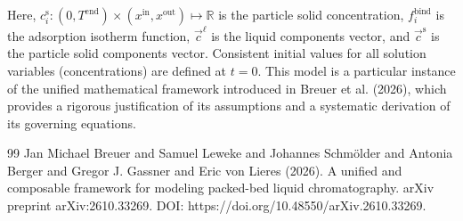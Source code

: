 \documentclass{article}
\begin{document}
Here, $c^{\mathrm{s}}_{i}\colon (0, T^{\mathrm{end}}) \times (x^{\mathrm{in}}, x^{\mathrm{out}}) \mapsto \mathbb{R}$ is the particle solid concentration, $f^{\mathrm{bind}}_{i}$ is the adsorption isotherm function, $\vec{c}^{\mathrm{\ell}}$ is the liquid components vector, and $\vec{c}^{\mathrm{s}}$ is the particle solid components vector.
Consistent initial values for all solution variables (concentrations) are defined at $t = 0$.
This model is a particular instance of the unified mathematical framework introduced in Breuer et al. (2026), which provides a rigorous justification of its assumptions and a systematic derivation of its governing equations.
\begin{thebibliography}{99}
     Jan Michael Breuer and Samuel Leweke and Johannes Schmölder and Antonia Berger and Gregor J. Gassner and Eric von Lieres (2026). A unified and composable framework for modeling packed-bed liquid chromatography. arXiv preprint arXiv:2610.33269. DOI: https://doi.org/10.48550/arXiv.2610.33269.
\end{thebibliography}
\end{document}
